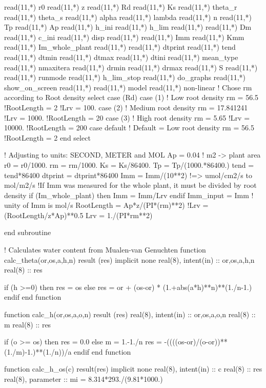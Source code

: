   read(11,*) r0
  read(11,*) z
  read(11,*) Rd
  read(11,*) Ks
  read(11,*) theta_r
  read(11,*) theta_s
  read(11,*) alpha
  read(11,*) lambda
  read(11,*) n
  read(11,*) Tp
  read(11,*) Ap
  read(11,*) h_ini
  read(11,*) h_lim
  read(11,*)
  read(11,*) Dm
  read(11,*) c_ini
  read(11,*) disp
  read(11,*)
  read(11,*) Imm
  read(11,*) Kmm
  read(11,*) Im_whole_plant
  read(11,*)
  read(11,*) dtprint
  read(11,*) tend
  read(11,*) dtmin
  read(11,*) dtmax
  read(11,*) dtini
  read(11,*) mean_type
  read(11,*) nmaxitera
  read(11,*) drmin
  read(11,*) drmax
  read(11,*) S
  read(11,*)
  read(11,*) runmode
  read(11,*) h_lim_stop
  read(11,*) do_graphs
  read(11,*) show_on_screen
  read(11,*)
  read(11,*) model
  read(11,*) non-linear
  ! Chose rm according to Root density
  select case (Rd) 
    case (1)		! Low root density
      rm = 56.5
      !RootLength = 2 
      !Lrv = 100.
    case (2)		! Medium root density
      rm = 17.841241
      !Lrv = 1000.
      !RootLength = 20
    case (3)		! High root density
      rm = 5.65
      !Lrv = 10000.
      !RootLength = 200
    case default	! Default = Low root density
      rm = 56.5
      !RootLength = 2
  end select

  ! Adjusting to units: SECOND, METER and MOL
  Ap = 0.04   ! m2 -> plant area
  r0 = r0/1000.
  rm = rm/1000.
  Ks = Ks/86400.
  Tp = Tp/(1000.*86400.)
  tend = tend*86400
  dtprint = dtprint*86400
  Imm = Imm/(10**2) !=> umol/cm2/s to mol/m2/s
  !If Imm was measured for the whole plant, it must be divided by root density
  if (Im_whole_plant) then
    Imm = Imm/Lrv
  endif
  Imm_input = Imm
  ! unity of Imm is mol/s
  RootLength = Ap*z/(PI*(rm)**2)
  !Lrv = (RootLength/z*Ap)**0.5
  Lrv = 1./(PI*rm**2)

end subroutine

! Calculates water content from Mualen-van Genuchten
function calc_theta(or,os,a,h,n) result (res)
implicit none
  real(8), intent(in) :: or,os,a,h,n
  real(8) 	      :: res
  
  if (h >=0) then
    res = os
  else
    res = or + (os-or) * (1.+abs(a*h)**n)**(1./n-1.)
  endif
end function

function calc_h(or,os,a,o,n) result (res)
  real(8), intent(in) :: or,os,a,o,n
  real(8) :: m
  real(8) 	      :: res

  if (o >= os) then
    res = 0.0
  else
    m = 1.-1./n
    res = -((((os-or)/(o-or))**(1./m)-1.)**(1./n))/a
  endif
end function

function calc_h_os(c) result(res)
implicit none
  real(8), intent(in) :: c
  real(8)	      :: res
  real(8), parameter  :: mi = 8.314*293./(9.81*1000.)
  
